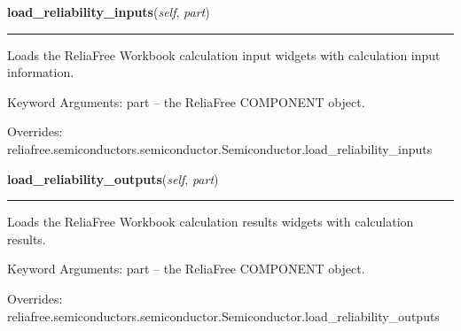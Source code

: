     \vspace{0.5ex}

\hspace{.8\funcindent}\begin{boxedminipage}{\funcwidth}

    \raggedright \textbf{load\_reliability\_inputs}(\textit{self}, \textit{part})

    \vspace{-1.5ex}

    \rule{\textwidth}{0.5\fboxrule}
\setlength{\parskip}{2ex}
    Loads the ReliaFree Workbook calculation input widgets with calculation
    input information.

    Keyword Arguments: part -- the ReliaFree COMPONENT object.

\setlength{\parskip}{1ex}
      Overrides: reliafree.semiconductors.semiconductor.Semiconductor.load\_reliability\_inputs

    \end{boxedminipage}

    \vspace{0.5ex}

\hspace{.8\funcindent}\begin{boxedminipage}{\funcwidth}

    \raggedright \textbf{load\_reliability\_outputs}(\textit{self}, \textit{part})

    \vspace{-1.5ex}

    \rule{\textwidth}{0.5\fboxrule}
\setlength{\parskip}{2ex}
    Loads the ReliaFree Workbook calculation results widgets with 
    calculation results.

    Keyword Arguments: part -- the ReliaFree COMPONENT object.

\setlength{\parskip}{1ex}
      Overrides: reliafree.semiconductors.semiconductor.Semiconductor.load\_reliability\_outputs

    \end{boxedminipage}

    \label{reliafree:semiconductors:thyristor:Thyristor:calculate_mil_217_count}

    \vspace{0.5ex}

